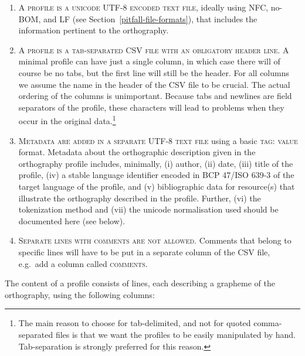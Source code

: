 \begin{enumerate}
	\def\labelenumi{A\arabic{enumi}.} 
	\item \textsc{A profile is a unicode UTF-8 encoded text file}, ideally
       using NFC, no-BOM, and LF (see Section~\ref{pitfall-file-formats}), that
       includes the information pertinent to the orthography. 
	\item \textsc{A profile is a tab-separated CSV file with an obligatory header
       line}. A minimal profile can have just a single column, in which case
       there will of course be no tabs, but the first line will still be the
       header. For all columns we assume the name in the header of the CSV file
       to be crucial. The actual ordering of the columns is unimportant. Because 
       tabs and newlines are field separators of the profile, these characters 
       will lead to problems when they occur in the original data.\footnote{The main
       reason to choose for tab-delimited, and not for quoted comma-separated files
       is that we want the profiles to be easily manipulated by hand. Tab-separation 
       is strongly preferred for this reason.}
	\item \textsc{Metadata are added in a separate UTF-8 text file} using a basic
       \textsc{tag: value} format. Metadata about the orthographic description
       given in the orthography profile includes, minimally, (i) author, (ii)
       date, (iii) title of the profile, (iv) a stable language identifier
       encoded in BCP 47/ISO 639-3 of the target language of the profile, and (v)
       bibliographic data for resource(s) that illustrate the orthography
       described in the profile. Further, (vi) the tokenization method and (vii)
       the unicode normalisation used should be documented here (see below).
    	\item \textsc{Separate lines with comments are not allowed}. Comments that
       belong to specific lines will have to be put in a separate column of
       the CSV file, e.g.~add a column called \textsc{comments}.            
\end{enumerate}

\noindent The content of a profile consists of lines, each describing a grapheme
of the orthography, using the following columns:

